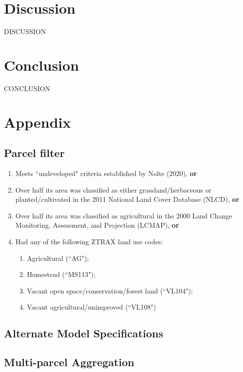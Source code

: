 \documentclass[12pt]{article}
\begin{document}
\newpage

\section{Discussion}

DISCUSSION

\newpage

\section{Conclusion}

CONCLUSION

\newpage

\section{Appendix}


\subsection{Parcel filter}

\begin{enumerate}
    \item Meets ``undeveloped" criteria established by Nolte (2020), \textbf{or}
    \item Over half its area was classified as either grassland/herbaceous or planted/cultivated in the 2011 National Land Cover Database (NLCD), \textbf{or}
    \item Over half its area was classified as agricultural in the 2000 Land Change Monitoring, Assessment, and Projection (LCMAP), \textbf{or}
    \item Had any of the following ZTRAX land use codes:
    \begin{enumerate}
        \item Agricultural (``AG");
        \item Homestead (``MS113");
        \item Vacant open space/conservation/forest land (``VL104");
        \item Vacant agricultural/unimproved (``VL108")
    \end{enumerate}
\end{enumerate}

\subsection{Alternate Model Specifications}


\subsection{Multi-parcel Aggregation}



\newpage


\printbibliography
\end{document}
